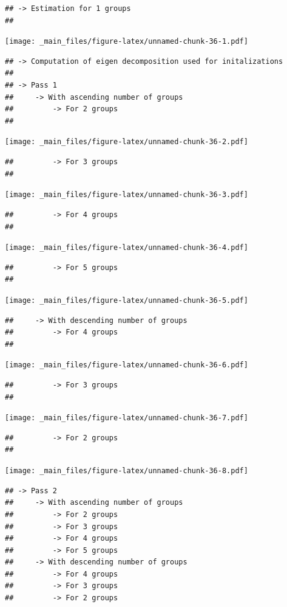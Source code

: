 \documentclass[
]{book}
\theoremstyle{definition}
\theoremstyle{definition}
\theoremstyle{definition}
\theoremstyle{definition}
\theoremstyle{remark}
\begin{document}
\begin{verbatim}
## -> Estimation for 1 groups
## 
\end{verbatim}

\texttt{[image: \_main\_files/figure-latex/unnamed-chunk-36-1.pdf]}

\begin{verbatim}
## -> Computation of eigen decomposition used for initalizations
## 
## -> Pass 1
##     -> With ascending number of groups
##         -> For 2 groups
## 
\end{verbatim}

\texttt{[image: \_main\_files/figure-latex/unnamed-chunk-36-2.pdf]}

\begin{verbatim}
##         -> For 3 groups
## 
\end{verbatim}

\texttt{[image: \_main\_files/figure-latex/unnamed-chunk-36-3.pdf]}

\begin{verbatim}
##         -> For 4 groups
## 
\end{verbatim}

\texttt{[image: \_main\_files/figure-latex/unnamed-chunk-36-4.pdf]}

\begin{verbatim}
##         -> For 5 groups
## 
\end{verbatim}

\texttt{[image: \_main\_files/figure-latex/unnamed-chunk-36-5.pdf]}

\begin{verbatim}
##     -> With descending number of groups
##         -> For 4 groups
## 
\end{verbatim}

\texttt{[image: \_main\_files/figure-latex/unnamed-chunk-36-6.pdf]}

\begin{verbatim}
##         -> For 3 groups
## 
\end{verbatim}

\texttt{[image: \_main\_files/figure-latex/unnamed-chunk-36-7.pdf]}

\begin{verbatim}
##         -> For 2 groups
## 
\end{verbatim}

\texttt{[image: \_main\_files/figure-latex/unnamed-chunk-36-8.pdf]}

\begin{verbatim}
## -> Pass 2
##     -> With ascending number of groups
##         -> For 2 groups
##         -> For 3 groups
##         -> For 4 groups
##         -> For 5 groups
##     -> With descending number of groups
##         -> For 4 groups
##         -> For 3 groups
##         -> For 2 groups
\end{verbatim}
\end{document}
